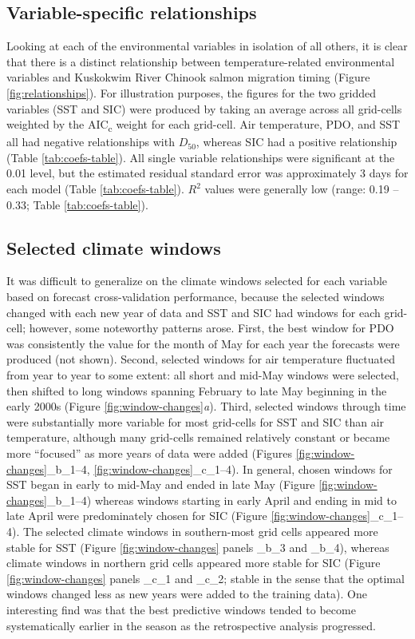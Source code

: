 \documentclass[12pt,]{book}
\theoremstyle{definition}
\theoremstyle{definition}
\theoremstyle{definition}
\theoremstyle{remark}
\begin{document}
\subsection{Variable-specific
relationships}\label{variable-specific-relationships}

\noindent
Looking at each of the environmental variables in isolation of all
others, it is clear that there is a distinct relationship between
temperature-related environmental variables and Kuskokwim River Chinook
salmon migration timing (Figure \ref{fig:relationships}). For
illustration purposes, the figures for the two gridded variables (SST
and SIC) were produced by taking an average across all grid-cells
weighted by the AIC\textsubscript{c} weight for each grid-cell. Air
temperature, PDO, and SST all had negative relationships with
\(D_{50}\), whereas SIC had a positive relationship (Table
\ref{tab:coefs-table}). All single variable relationships were
significant at the 0.01 level, but the estimated residual standard error
was approximately 3 days for each model (Table \ref{tab:coefs-table}).
\(R^2\) values were generally low (range: 0.19 -- 0.33; Table
\ref{tab:coefs-table}).

\subsection{Selected climate windows}\label{selected-climate-windows}

\noindent
It was difficult to generalize on the climate windows selected for each
variable based on forecast cross-validation performance, because the
selected windows changed with each new year of data and SST and SIC had
windows for each grid-cell; however, some noteworthy patterns arose.
First, the best window for PDO was consistently the value for the month
of May for each year the forecasts were produced (not shown). Second,
selected windows for air temperature fluctuated from year to year to
some extent: all short and mid-May windows were selected, then shifted
to long windows spanning February to late May beginning in the early
2000s (Figure \ref{fig:window-changes}\emph{a}). Third, selected windows
through time were substantially more variable for most grid-cells for
SST and SIC than air temperature, although many grid-cells remained
relatively constant or became more ``focused'' as more years of data
were added (Figures \ref{fig:window-changes}\_b\_1--4,
\ref{fig:window-changes}\_c\_1--4). In general, chosen windows for SST
began in early to mid-May and ended in late May (Figure
\ref{fig:window-changes}\_b\_1--4) whereas windows starting in early
April and ending in mid to late April were predominately chosen for SIC
(Figure \ref{fig:window-changes}\_c\_1--4). The selected climate windows
in southern-most grid cells appeared more stable for SST (Figure
\ref{fig:window-changes} panels \_b\_3 and \_b\_4), whereas climate
windows in northern grid cells appeared more stable for SIC (Figure
\ref{fig:window-changes} panels \_c\_1 and \_c\_2; stable in the sense
that the optimal windows changed less as new years were added to the
training data). One interesting find was that the best predictive
windows tended to become systematically earlier in the season as the
retrospective analysis progressed.
\end{document}
